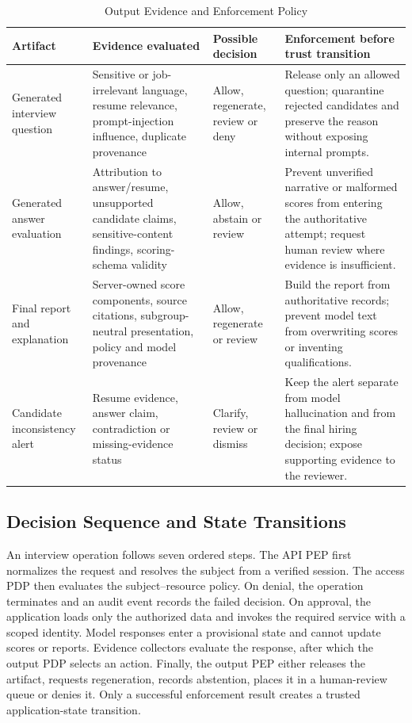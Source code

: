 \documentclass[conference]{IEEEtran}
\begin{document}
\begin{table}[t]
\caption{Output Evidence and Enforcement Policy}
\label{tab:output-policy}
\centering
\footnotesize
\renewcommand{\arraystretch}{1.12}
\begin{tabular}{@{}p{}p{}p{}p{}@{}}
\toprule
\textbf{Artifact} & \textbf{Evidence evaluated} & \textbf{Possible decision} & \textbf{Enforcement before trust transition} \\
\midrule
Generated interview question & Sensitive or job-irrelevant language, resume relevance, prompt-injection influence, duplicate provenance & Allow, regenerate, review or deny & Release only an allowed question; quarantine rejected candidates and preserve the reason without exposing internal prompts. \\
Generated answer evaluation & Attribution to answer/resume, unsupported candidate claims, sensitive-content findings, scoring-schema validity & Allow, abstain or review & Prevent unverified narrative or malformed scores from entering the authoritative attempt; request human review where evidence is insufficient. \\
Final report and explanation & Server-owned score components, source citations, subgroup-neutral presentation, policy and model provenance & Allow, regenerate or review & Build the report from authoritative records; prevent model text from overwriting scores or inventing qualifications. \\
Candidate inconsistency alert & Resume evidence, answer claim, contradiction or missing-evidence status & Clarify, review or dismiss & Keep the alert separate from model hallucination and from the final hiring decision; expose supporting evidence to the reviewer. \\
\bottomrule
\end{tabular}
\end{table}

\subsection{Decision Sequence and State Transitions}

An interview operation follows seven ordered steps. The API PEP first normalizes the request and resolves the subject from a verified session. The access PDP then evaluates the subject--resource policy. On denial, the operation terminates and an audit event records the failed decision. On approval, the application loads only the authorized data and invokes the required service with a scoped identity. Model responses enter a provisional state and cannot update scores or reports. Evidence collectors evaluate the response, after which the output PDP selects an action. Finally, the output PEP either releases the artifact, requests regeneration, records abstention, places it in a human-review queue or denies it. Only a successful enforcement result creates a trusted application-state transition.
\end{document}
